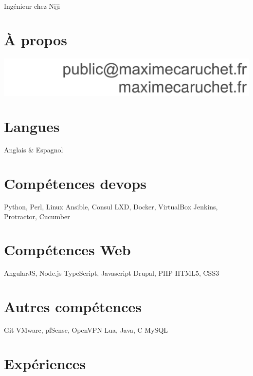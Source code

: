 \documentclass[]{friggeri-cv}
\begin{document}
       {Ingénieur chez Niji}


\begin{aside}
  \section{À propos}
    \includegraphics[width=\textwidth]{personal_details}
  \section{Langues}
    Anglais \& Espagnol
  \section{Compétences devops}
    Python, Perl, Linux
    Ansible, Consul
    LXD, Docker, VirtualBox
    Jenkins, Protractor, Cucumber
  \section{Compétences Web}
    AngularJS, Node.js
    TypeScript, Javascript
    Drupal, PHP
    HTML5, CSS3
  \section{Autres compétences}
    Git
    VMware, pfSense, OpenVPN
    Lua, Java, C
    MySQL
\end{aside}

\section{Expériences}
\end{document}
